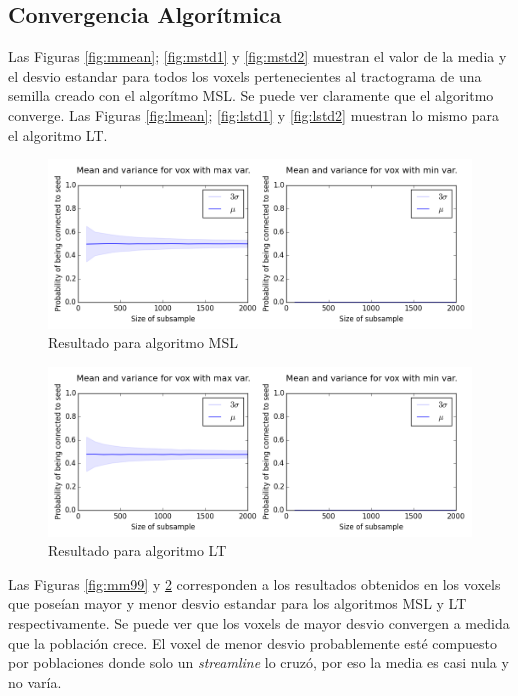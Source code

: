 \subsection{Convergencia Algor\'itmica}
Las Figuras \ref{fig:mmean}; \ref{fig:mstd1} y \ref{fig:mstd2} muestran el valor
de la media y el desvio estandar para todos los voxels pertenecientes al tractograma
de una semilla creado con el algor\'itmo MSL. Se puede ver claramente que el 
algoritmo converge. Las Figuras \ref{fig:lmean}; \ref{fig:lstd1} y \ref{fig:lstd2} 
muestran lo mismo para el algoritmo LT.

\begin{figure}[h!]
   \centering
    \includegraphics[width=\textwidth]{img/mvmsl_97_124_62.png}
    \caption{Resultado para algoritmo MSL}
    \label{fig:mm94}
\end{figure}

\begin{figure}[h!]
   \centering
    \includegraphics[width=\textwidth]{img/mvlt_97_124_62.png}
    \caption{Resultado para algoritmo LT}
    \label{fig:ml94}
\end{figure}

Las Figuras \ref{fig:mm99} y \ref{fig:ml94} corresponden a los resultados obtenidos
en los voxels que pose\'ian mayor y menor desvio estandar para los algoritmos 
MSL y LT respectivamente. 
Se puede ver que los voxels de mayor desvio convergen a medida que la poblaci\'on 
crece. El voxel de menor desvio probablemente est\'e compuesto por poblaciones donde solo un 
\textit{streamline} lo cruz\'o, por eso la media es casi nula y no var\'ia.


